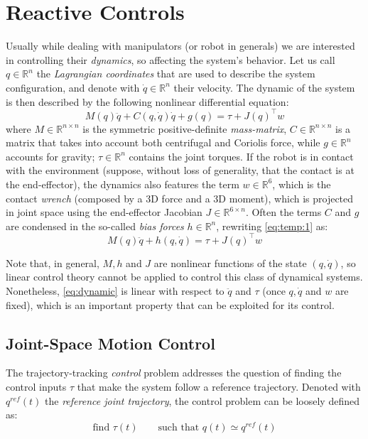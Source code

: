 \chapter{Reactive Controls}
	Usually while dealing with manipulators (or robot in generals) we are interested in controlling their \textit{dynamics}, so affecting the system's behavior. Let us call $q \in \mathds R^n$ the \textit{Lagrangian coordinates} that are used to describe the system configuration, and denote with $\dot q \in \mathds R^n$ their velocity. The dynamic of the system is then described by the following nonlinear differential equation:
	\begin{equation} \label{eq:temp:1}
		M(q) \ddot q + C(q,\dot q) \dot q + g(q) = \tau + J(q)^\top w
	\end{equation}
	where $M\in \mathds R^{n\times n}$ is the symmetric positive-definite \textit{mass-matrix}, $C \in \mathds R^{n\times n}$ is a matrix that takes into account both centrifugal and Coriolis force, while $g \in \mathds R^n$ accounts for gravity; $\tau \in \mathds R^n$ contains the joint torques.
	If the robot is in contact with the environment (suppose, without loss of generality, that the contact is at the end-effector), the dynamics also features the term $w \in \mathds R^6$, which is the contact \textit{wrench} (composed by a 3D force and a 3D moment), which is projected in joint space using the end-effector Jacobian $J \in \mathds R^{6 \times n}$. 
	Often the terms $C$ and $g$ are condensed in the so-called \textit{bias forces} $h \in \mathds R^n$, rewriting \eqref{eq:temp:1} as:
	\begin{equation} \label{eq:dynamic}
		M(q) \ddot q + h(q,\dot q) = \tau + J(q)^\top w
	\end{equation}

	Note that, in general, $M, h$ and $J$ are nonlinear functions of the state $(q,\dot q)$, so linear control theory cannot be applied to control this class of dynamical systems. 
	Nonetheless, \eqref{eq:dynamic} is linear with respect to $\ddot q$ and $\tau$ (once $q,\dot q$ and $w$ are fixed), which is an important property that can be exploited for its control.
	
\section{Joint-Space Motion Control}
	The trajectory-tracking \textit{control} problem addresses the question of finding the control inputs $\tau$ that make the system follow a reference trajectory. 
	Denoted with $q^{ref}(t)$ the \textit{reference joint trajectory}, the control problem can be loosely defined as:
	\[ \textrm{find } \tau(t) \qquad \textrm{such that } q(t) \simeq q^{ref}(t) \]
	
